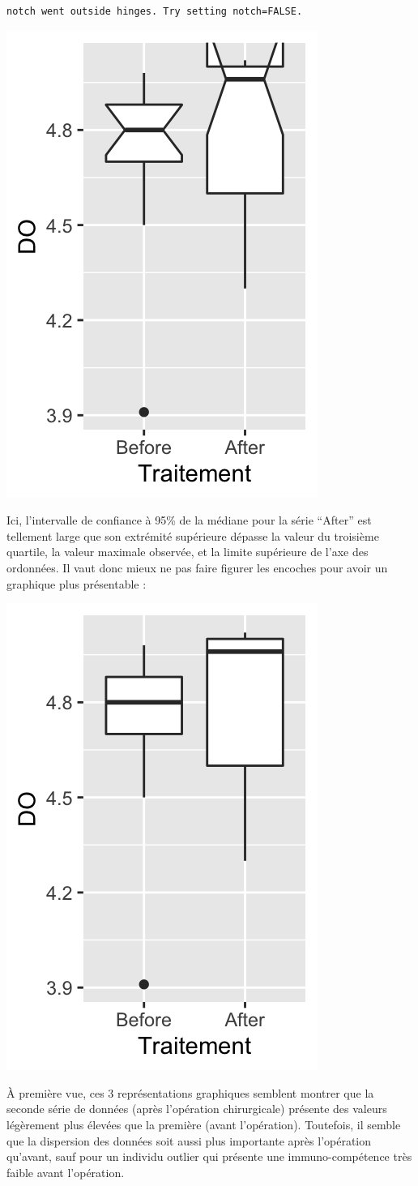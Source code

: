 \documentclass[a4paperpaper,]{article}
\newenvironment{Shaded}{\begin{snugshade}}{\end{snugshade}}
\newcommand{\DataTypeTok}[1]{\textcolor[rgb]{0.00,0.34,0.68}{#1}}
\newcommand{\KeywordTok}[1]{\textcolor[rgb]{0.12,0.11,0.11}{\textbf{#1}}}
\newcommand{\NormalTok}[1]{\textcolor[rgb]{0.12,0.11,0.11}{#1}}
\newcommand{\OperatorTok}[1]{\textcolor[rgb]{0.12,0.11,0.11}{#1}}
\newcommand{\StringTok}[1]{\textcolor[rgb]{0.75,0.01,0.01}{#1}}
\begin{document}
\begin{verbatim}
notch went outside hinges. Try setting notch=FALSE.
\end{verbatim}

\begin{center}\includegraphics[width=0.25\linewidth]{figure/unnamed-chunk-34-1} \end{center}

Ici, l'intervalle de confiance à 95\% de la médiane pour la série ``After'' est tellement large que son extrémité supérieure dépasse la valeur du troisième quartile, la valeur maximale observée, et la limite supérieure de l'axe des ordonnées. Il vaut donc mieux ne pas faire figurer les encoches pour avoir un graphique plus présentable :

\begin{Shaded}
\end{Shaded}

\begin{center}\includegraphics[width=0.25\linewidth]{figure/unnamed-chunk-35-1} \end{center}

À première vue, ces 3 représentations graphiques semblent montrer que la seconde série de données (après l'opération chirurgicale) présente des valeurs légèrement plus élevées que la première (avant l'opération). Toutefois, il semble que la dispersion des données soit aussi plus importante après l'opération qu'avant, sauf pour un individu outlier qui présente une immuno-compétence très faible avant l'opération.
\end{document}
